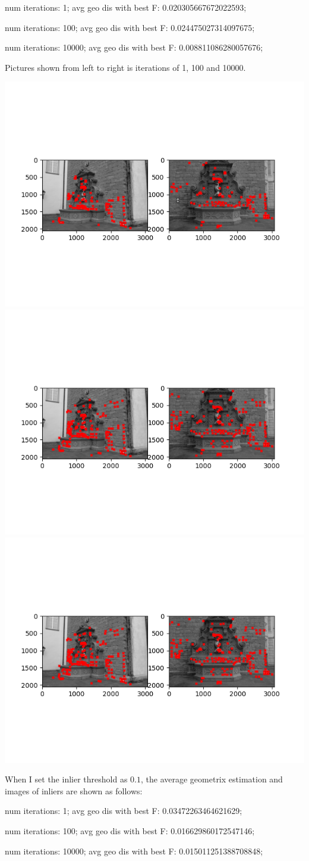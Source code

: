 \documentclass[11pt]{article}
\begin{document}
num iterations: 1; avg geo dis with best F: 0.020305667672022593;

num iterations: 100; avg geo dis with best F: 0.024475027314097675;

num iterations: 10000; avg geo dis with best F: 0.008811086280057676;

Pictures shown from left to right is iterations of 1, 100 and 10000.
\begin{center}
    \small
    \includegraphics[width=0.3\linewidth]{fig/q3threshold0.01iter1.png}
    \includegraphics[width=0.3\linewidth]{fig/q3threshold0.01iter10.png}
    \includegraphics[width=0.3\linewidth]{fig/q3threshold0.01iter100.png}
\end{center}
When I set the inlier threshold as $0.1$, the average geometrix estimation and images of inliers are shown as follows:

num iterations: 1; avg geo dis with best F: 0.03472263464621629;

num iterations: 100; avg geo dis with best F: 0.016629860172547146;

num iterations: 10000; avg geo dis with best F: 0.015011251388708848;
\end{document}

